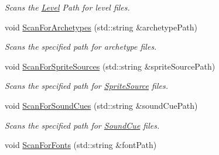 \begin{DoxyCompactItemize}
\begin{DoxyCompactList}\small\item\em Scans the \hyperlink{classDCEngine_1_1Level}{Level} Path for level files. \end{DoxyCompactList}\item 
\hypertarget{classDCEngine_1_1Systems_1_1Content_a63a432212a81871dafdd5aad9b3b3712}{void \hyperlink{classDCEngine_1_1Systems_1_1Content_a63a432212a81871dafdd5aad9b3b3712}{Scan\-For\-Archetypes} (std\-::string \&archetype\-Path)}\label{classDCEngine_1_1Systems_1_1Content_a63a432212a81871dafdd5aad9b3b3712}

\begin{DoxyCompactList}\small\item\em Scans the specified path for archetype files. \end{DoxyCompactList}\item 
\hypertarget{classDCEngine_1_1Systems_1_1Content_a3d8d040abd7214ca68b81af33fe93ff2}{void \hyperlink{classDCEngine_1_1Systems_1_1Content_a3d8d040abd7214ca68b81af33fe93ff2}{Scan\-For\-Sprite\-Sources} (std\-::string \&sprite\-Source\-Path)}\label{classDCEngine_1_1Systems_1_1Content_a3d8d040abd7214ca68b81af33fe93ff2}

\begin{DoxyCompactList}\small\item\em Scans the specified path for \hyperlink{classDCEngine_1_1SpriteSource}{Sprite\-Source} files. \end{DoxyCompactList}\item 
\hypertarget{classDCEngine_1_1Systems_1_1Content_a0a335e453e8e726d9f95be70ffb824b7}{void \hyperlink{classDCEngine_1_1Systems_1_1Content_a0a335e453e8e726d9f95be70ffb824b7}{Scan\-For\-Sound\-Cues} (std\-::string \&sound\-Cue\-Path)}\label{classDCEngine_1_1Systems_1_1Content_a0a335e453e8e726d9f95be70ffb824b7}

\begin{DoxyCompactList}\small\item\em Scans the specified path for \hyperlink{classDCEngine_1_1SoundCue}{Sound\-Cue} files. \end{DoxyCompactList}\item 
\hypertarget{classDCEngine_1_1Systems_1_1Content_a2900eb911301c2bfff4ed2ed6bebeb85}{void \hyperlink{classDCEngine_1_1Systems_1_1Content_a2900eb911301c2bfff4ed2ed6bebeb85}{Scan\-For\-Fonts} (std\-::string \&font\-Path)}\label{classDCEngine_1_1Systems_1_1Content_a2900eb911301c2bfff4ed2ed6bebeb85}


\end{DoxyCompactItemize}
